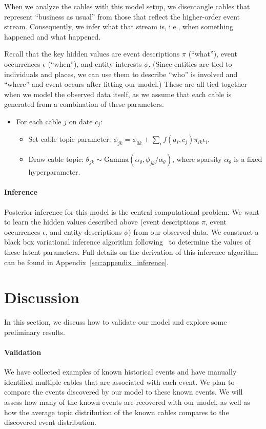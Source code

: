 When we analyze the cables with this model setup, we disentangle cables that represent ``business as usual'' from those that reflect the higher-order event stream.  Consequently, we infer what that stream is,
i.e., when something happened and what happened.

Recall that the key hidden values are event descriptions $\pi$ (``what''), event occurrences $\epsilon$ (``when''), and entity interests $\phi$.  (Since entities are tied to individuals and places, we can use them to describe ``who'' is involved and ``where'' and event occurs after fitting our model.)  These are all tied together when we model the observed data itself, as we assume that each cable is generated from a combination of these parameters.
\begin{itemize}
\item For each cable $j$ on date $c_j$:
\begin{itemize}
	\item Set cable topic parameter: $\phi_{jk} = \phi_{0k} + \sum_i f(a_i, c_j) \pi_{ik} \epsilon_i$.
	\item Draw cable topic: $\theta_{jk} \sim \mbox{Gamma}(\alpha_\theta, \phi_{jk} / \alpha_\theta)$, where sparsity $\alpha_\theta$ is a fixed hyperparameter.
\end{itemize}
\end{itemize}



\paragraph{Inference}
Posterior inference for this model is the central computational problem.  We want to learn the hidden values described above (event descriptions $\pi$, event occurrences $\epsilon$, and entity descriptions $\phi$) from our observed data.  We construct a black box variational inference algorithm following~\citet{Ranganath:2014} to determine the values of these latent parameters.  Full details on the derivation of this inference algorithm can be found in Appendix~\ref{sec:appendix_inference}.

\section{Discussion}
In this section, we discuss how to validate our model and explore some preliminary results.

\paragraph{Validation}
We have collected examples of known historical events and have manually identified multiple cables that are associated with each event.  We plan to compare the events discovered by our model to these known events.  We will assess how many of the known events are recovered with our model, as well as how the average topic distribution of the known cables compares to the discovered event distribution.

